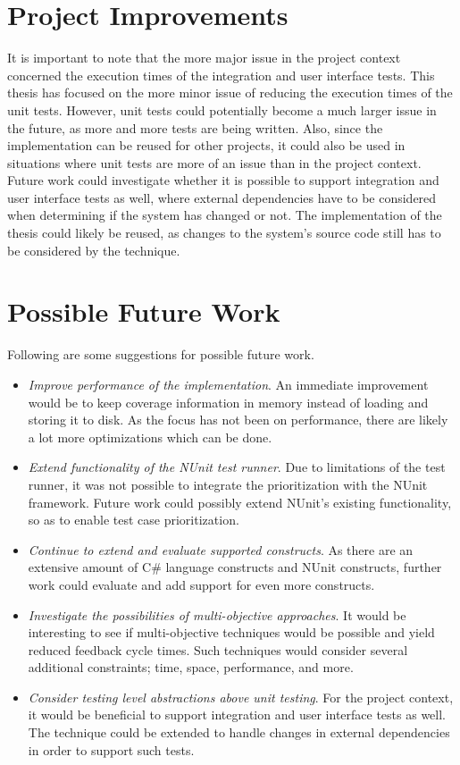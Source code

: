 \documentclass[a4paper,english,12pt]{report}
\begin{document}
\section{Project Improvements}
It is important to note that the more major issue in the project context concerned the execution times of the integration and user interface tests. This thesis has focused on the more minor issue of reducing the execution times of the unit tests. However, unit tests could potentially become a much larger issue in the future, as more and more tests are being written. Also, since the implementation can be reused for other projects, it could also be used in situations where unit tests are more of an issue than in the project context. Future work could investigate whether it is possible to support integration and user interface tests as well, where external dependencies have to be considered when determining if the system has changed or not. The implementation of the thesis could likely be reused, as changes to the system's source code still has to be considered by the technique.

\section{Possible Future Work}
Following are some suggestions for possible future work.

\begin{itemize}
  \item\textit{Improve performance of the implementation}. An immediate improvement would be to keep coverage information in memory instead of loading and storing it to disk. As the focus has not been on performance, there are likely a lot more optimizations which can be done.
  \item\textit{Extend functionality of the NUnit test runner}. Due to limitations of the test runner, it was not possible to integrate the prioritization with the NUnit framework. Future work could possibly extend NUnit's existing functionality, so as to enable test case prioritization.
  \item\textit{Continue to extend and evaluate supported constructs}. As there are an extensive amount of C\# language constructs and NUnit constructs, further work could evaluate and add support for even more constructs.
  \item\textit{Investigate the possibilities of multi-objective approaches}. It would be interesting to see if multi-objective techniques would be possible and yield reduced feedback cycle times. Such techniques would consider several additional constraints; time, space, performance, and more.
  \item\textit{Consider testing level abstractions above unit testing}. For the project context, it would be beneficial to support integration and user interface tests as well. The technique could be extended to handle changes in external dependencies in order to support such tests.
\end{itemize}
\end{document}
